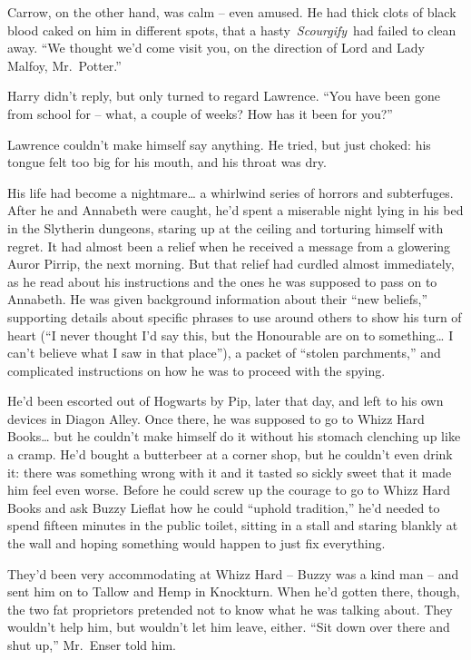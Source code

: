 Carrow, on the other hand, was calm -- even amused. He had thick clots
of black blood caked on him in different spots, that a
hasty~\emph{Scourgify}~had failed to clean away. ``We thought we'd come
visit you, on the direction of Lord and Lady Malfoy, Mr.~Potter.''

Harry didn't reply, but only turned to regard Lawrence. ``You have been
gone from school for -- what, a couple of weeks? How has it been for
you?''

Lawrence couldn't make himself say anything. He tried, but just choked:
his tongue felt too big for his mouth, and his throat was dry.

His life had become a nightmare\ldots{} a whirlwind series of horrors
and subterfuges. After he and Annabeth were caught, he'd spent a
miserable night lying in his bed in the Slytherin dungeons, staring up
at the ceiling and torturing himself with regret. It had almost been a
relief when he received a message from a glowering Auror Pirrip, the
next morning. But that relief had curdled almost immediately, as he read
about his instructions and the ones he was supposed to pass on to
Annabeth. He was given background information about their ``new
beliefs,'' supporting details about specific phrases to use around
others to show his turn of heart (``I never thought I'd say this, but
the Honourable are on to something\ldots{} I can't believe what I saw in
that place''), a packet of ``stolen parchments,'' and complicated
instructions on how he was to proceed with the spying.

He'd been escorted out of Hogwarts by Pip, later that day, and left to
his own devices in Diagon Alley. Once there, he was supposed to go to
Whizz Hard Books\ldots{} but he couldn't make himself do it without his
stomach clenching up like a cramp. He'd bought a butterbeer at a corner
shop, but he couldn't even drink it: there was something wrong with it
and it tasted so sickly sweet that it made him feel even worse. Before
he could screw up the courage to go to Whizz Hard Books and ask Buzzy
Lieflat how he could ``uphold tradition,'' he'd needed to spend fifteen
minutes in the public toilet, sitting in a stall and staring blankly at
the wall and hoping something would happen to just fix everything.

They'd been very accommodating at Whizz Hard -- Buzzy was a kind man --
and sent him on to Tallow and Hemp in Knockturn. When he'd gotten there,
though, the two fat proprietors pretended not to know what he was
talking about. They wouldn't help him, but wouldn't let him leave,
either. ``Sit down over there and shut up,'' Mr.~Enser told him.

